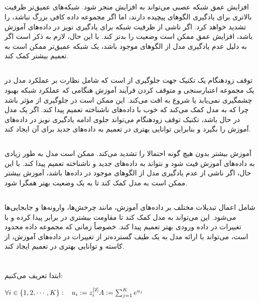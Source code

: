 \documentclass{article}
\begin{document}
\subsection{}
افزایش عمق شبکه عصبی می‌تواند به افزایش  منجر شود. شبکه‌های عمیق‌تر ظرفیت بالاتری برای یادگیری الگوهای پیچیده دارند، اما اگر مجموعه داده کافی بزرگ نباشد،  را تشدید خواهد کرد. اگر  ناشی از ظرفیت شبکه برای یادگیری نویز در داده‌های آموزش باشد، افزایش عمق ممکن است وضعیت را بدتر کند. با این حال، لازم به ذکر است اگر  به دلیل عدم یادگیری مدل از الگوهای موجود باشد، یک شبکه عمیق‌تر ممکن است به تعمیم بیشتر کمک کند.

\subsection{}
توقف زودهنگام یک تکنیک جهت جلوگیری از  است که شامل نظارت بر عملکرد مدل در یک مجموعه اعتبارسنجی و متوقف کردن فرآیند آموزش هنگامی که عملکرد شبکه بهبود چشمگیری نمی‌یابد یا شروع به افت می‌کند. این ممکن است در جلوگیری از  مؤثر باشد چرا که به مدل کمک می‌کند که خوب با داده‌های ناشناخته تعمیم پیدا کند. اگر یک مدل در حال  باشد، تکنیک توقف زودهنگام می‌تواند جلوی ادامه یادگیری نویز در داده‌های آموزش را بگیرد و بنابراین توانایی بهتری در تعمیم به داده‌های جدید برای آن ایجاد کند.
\subsection{}
آموزش بیشتر بدون هیچ گونه  احتمالا  را تشدید می‌کند. ممکن است مدل به طور زیادی به داده‌های آموزش فیت شود و نتواند به داده‌های جدید و ناشناخته تعمیم پیدا کند. با این حال، اگر  ناشی از عدم یادگیری مدل از الگوهای موجود در داده‌ها باشد، آموزش بیشتر ممکن است به مدل کمک کند تا به یک وضعیت بهتر همگرا شود.
\subsection{}
 شامل اعمال تبدیلات مختلف بر داده‌های آموزش، مانند چرخش‌ها، وارونه‌ها و جابجایی‌ها می‌شود. این می‌تواند به مدل کمک کند تا مقاومت بیشتری در برابر  پیدا کرده و با تغییرات در داده ورودی بهتر تعمیم پیدا کند.  خصوصاً زمانی که مجموعه داده محدود است، می‌تواند با ارائه مدل به یک طیف گسترده‌تر از تغییرات در داده‌های آموزش، از  کاسته و توانایی بهتری در تعمیم ایجاد کند.


\section{}
ابتدا تعریف می‌کنیم:
\begin{latin}
$
\forall i \in \left\{ 1, 2, \cdots, K \right\}: \:\:\:\: u_i := z^{[2]}_i \\ \\
A := \sum_{j = 1}^{K} e ^ {u_j}
$
\end{latin}
\end{document}
